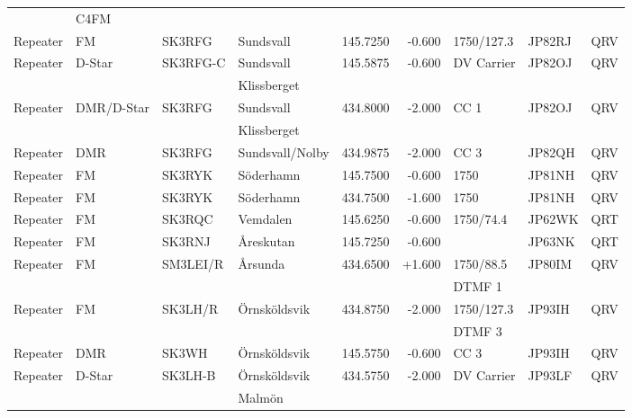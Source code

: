 \begin{landscape}
\begin{longtable}{llllrrlll}
           & C4FM       &          &                  &             &          &            &        &      \\
Repeater   & FM         & SK3RFG   & Sundsvall        & 145.7250    & -0.600   & 1750/127.3 & JP82RJ & QRV  \\
Repeater   & D-Star     & SK3RFG-C & Sundsvall        & 145.5875    & -0.600   & DV Carrier & JP82OJ & QRV  \\
           &            &          & Klissberget      &             &          &            &        &      \\
Repeater   & DMR/D-Star & SK3RFG   & Sundsvall        & 434.8000    & -2.000   & CC 1       & JP82OJ & QRV  \\
           &            &          & Klissberget      &             &          &            &        &      \\
Repeater   & DMR        & SK3RFG   & Sundsvall/Nolby  & 434.9875    & -2.000   & CC 3       & JP82QH & QRV  \\
Repeater   & FM         & SK3RYK   & Söderhamn        & 145.7500    & -0.600   & 1750       & JP81NH & QRV  \\
Repeater   & FM         & SK3RYK   & Söderhamn        & 434.7500    & -1.600   & 1750       & JP81NH & QRV  \\
Repeater   & FM         & SK3RQC   & Vemdalen         & 145.6250    & -0.600   & 1750/74.4  & JP62WK & QRT  \\
Repeater   & FM         & SK3RNJ   & Åreskutan        & 145.7250    & -0.600   &            & JP63NK & QRT  \\
Repeater   & FM         & SM3LEI/R & Årsunda          & 434.6500    & +1.600   & 1750/88.5  & JP80IM & QRV  \\
           &            &          &                  &             &          & DTMF 1     &        &      \\
Repeater   & FM         & SK3LH/R  & Örnsköldsvik     & 434.8750    & -2.000   & 1750/127.3 & JP93IH & QRV  \\
           &            &          &                  &             &          & DTMF 3     &        &      \\
Repeater   & DMR        & SK3WH    & Örnsköldsvik     & 145.5750    & -0.600   & CC 3       & JP93IH & QRV  \\
Repeater   & D-Star     & SK3LH-B  & Örnsköldsvik     & 434.5750    & -2.000   & DV Carrier & JP93LF & QRV  \\
           &            &          & Malmön           &             &          &            &        &      \\

\end{longtable}
\end{landscape}
